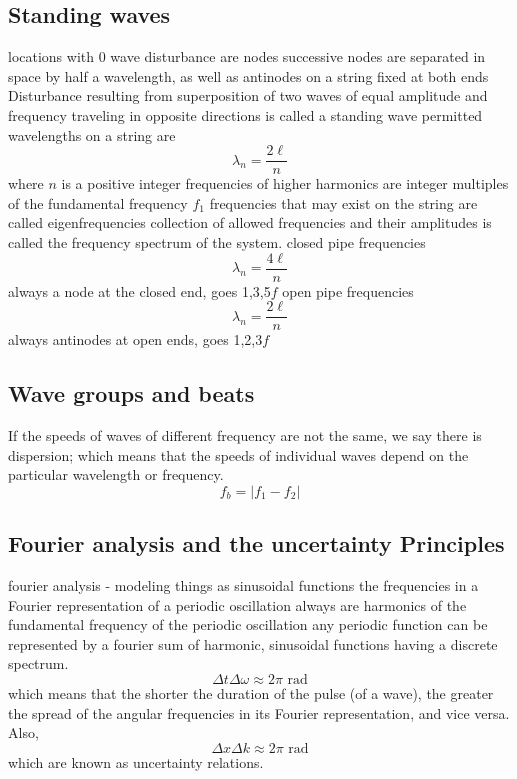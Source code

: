 \documentclass[twocolumn]{article}
\begin{document}
\subsection{Standing waves}
\begin{outline}
\1 locations with 0 wave disturbance are nodes
\1 successive nodes are separated in space by half a wavelength, as well as antinodes on a string fixed at both ends
\1 Disturbance resulting from superposition of two waves of equal amplitude and frequency traveling in opposite directions is called a standing wave
\1 permitted wavelengths on a string are \[\lambda_n=\dfrac{2\ell}{n}\] where $n$ is a positive integer
\1 frequencies of higher harmonics are integer multiples of the fundamental frequency $f_1$
\1 frequencies that may exist on the string are called eigenfrequencies
\1 collection of allowed frequencies and their amplitudes is called the frequency spectrum of the system. 
\1 closed pipe frequencies \[\lambda_n=\dfrac{4\ell}{n}\] always a node at the closed end, goes 1,3,5$f$
\1 open pipe frequencies \[\lambda_n=\dfrac{2\ell}{n}\] always antinodes at open ends, goes 1,2,3$f$
\end{outline}
\subsection{Wave groups and beats}
\begin{outline}
\1 If the speeds of waves of different frequency are not the same, we say there is dispersion; which means that the speeds of individual waves depend on the particular wavelength or frequency. 
\0 \[f_b=|f_1-f_2|\]
\end{outline}
\subsection{Fourier analysis and the uncertainty Principles}
\begin{outline}
\1 fourier analysis - modeling things as sinusoidal functions
\1 the frequencies in a Fourier representation of a periodic oscillation always are harmonics of the fundamental frequency of the periodic oscillation
\1 any periodic function can be represented by a fourier sum of harmonic, sinusoidal functions having a discrete spectrum. 
\0 \[\Delta t\Delta\omega\approx2\pi\text{ rad}\]
\1 which means that the shorter the duration of the pulse (of a wave), the greater the spread of the angular frequencies in its Fourier representation, and vice versa. Also, \[\Delta x\Delta k\approx2\pi\text{ rad}\]
\1 which are known as uncertainty relations.
\end{outline}
\end{document}
